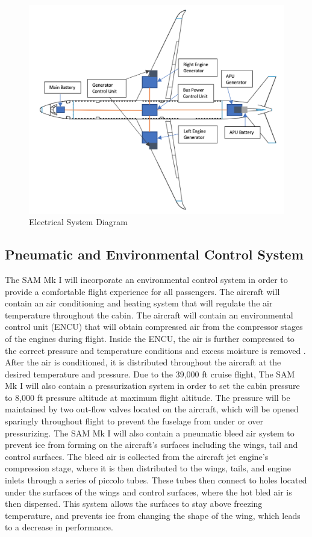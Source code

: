 \begin{figure}[H]
    \centering
    \includegraphics[width=.75\linewidth]{Photos/systems/electrical_system.png}
    \caption{Electrical System Diagram}
    \label{electrical_system}
\end{figure}


\subsection{Pneumatic and Environmental Control System}
The SAM Mk I will incorporate an environmental control system in order to provide a comfortable flight experience for all passengers. The aircraft will contain an air conditioning and heating system that will regulate the air temperature throughout the cabin. The aircraft will contain an environmental control unit (ENCU) that will obtain compressed air from the compressor stages of the engines during flight. Inside the ENCU, the air is further compressed to the correct pressure and temperature conditions and excess moisture is removed \cite{env_system}. After the air is conditioned, it is distributed throughout the aircraft at the desired temperature and pressure. Due to the 39,000 ft cruise flight, The SAM Mk I will also contain a pressurization system in order to set the cabin pressure to 8,000 ft pressure altitude at maximum flight altitude. The pressure will be maintained by two out-flow valves located on the aircraft, which will be opened sparingly throughout flight to prevent the fuselage from under or over pressurizing. The SAM Mk I will also contain a pneumatic bleed air system to prevent ice from forming on the aircraft’s surfaces including the wings, tail and control surfaces. The bleed air is collected from the aircraft jet engine’s compression stage, where it is then distributed to the wings, tails, and engine inlets through a series of piccolo tubes. These tubes then connect to holes located under the surfaces of the wings and control surfaces, where the hot bled air is then dispersed. This system allows the surfaces to stay above freezing temperature, and prevents ice from changing the shape of the wing, which leads to a decrease in performance.

